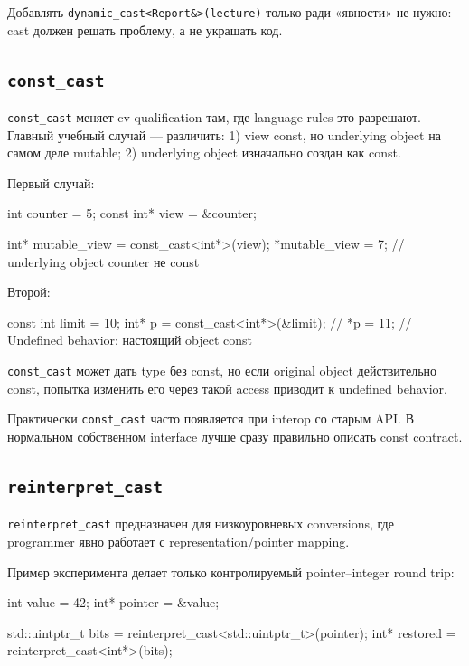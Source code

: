 Добавлять \texttt{dynamic\_cast<Report\&>(lecture)} только ради «явности»
не нужно: cast должен решать проблему, а не украшать код.

\subsection{\texttt{const\_cast}}

\texttt{const\_cast} меняет cv-qualification там, где language rules это
разрешают. Главный учебный случай --- различить:
1) view const, но underlying object на самом деле mutable; 2) underlying object изначально создан как const.

Первый случай:

\begin{cppcode}
int counter = 5;
const int* view = &counter;

int* mutable_view = const_cast<int*>(view);
*mutable_view = 7; // underlying object counter не const
\end{cppcode}

Второй:

\begin{cppcode}
const int limit = 10;
int* p = const_cast<int*>(&limit);
// *p = 11; // Undefined behavior: настоящий object const
\end{cppcode}

\begin{ubbox}
\texttt{const\_cast} может дать type без const, но если original object
действительно const, попытка изменить его через такой access приводит к
undefined behavior.
\end{ubbox}

Практически \texttt{const\_cast} часто появляется при interop со старым API.
В нормальном собственном interface лучше сразу правильно описать const contract.

\subsection{\texttt{reinterpret\_cast}}

\texttt{reinterpret\_cast} предназначен для низкоуровневых conversions, где
programmer явно работает с representation/pointer mapping.

Пример эксперимента делает только контролируемый pointer--integer round trip:

\begin{cppcode}
int value = 42;
int* pointer = &value;

std::uintptr_t bits =
    reinterpret_cast<std::uintptr_t>(pointer);
int* restored =
    reinterpret_cast<int*>(bits);
\end{cppcode}


